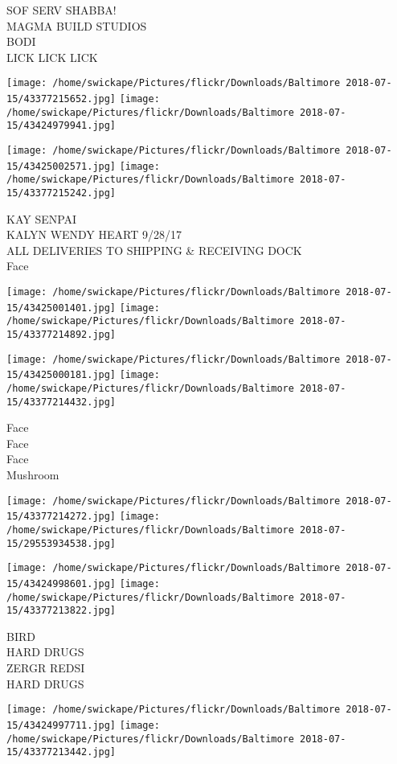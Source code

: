 \documentclass[10pt,letterpaper]{article}
\begin{document}
SOF SERV SHABBA!\\
MAGMA BUILD STUDIOS\\
BODI\\
LICK LICK LICK
\pagebreak

\texttt{[image: /home/swickape/Pictures/flickr/Downloads/Baltimore 2018-07-15/43377215652.jpg]}
\texttt{[image: /home/swickape/Pictures/flickr/Downloads/Baltimore 2018-07-15/43424979941.jpg]}

\texttt{[image: /home/swickape/Pictures/flickr/Downloads/Baltimore 2018-07-15/43425002571.jpg]}
\texttt{[image: /home/swickape/Pictures/flickr/Downloads/Baltimore 2018-07-15/43377215242.jpg]}

KAY SENPAI\\
KALYN WENDY HEART 9/28/17\\
ALL DELIVERIES TO SHIPPING \& RECEIVING DOCK\\
Face
\pagebreak

\texttt{[image: /home/swickape/Pictures/flickr/Downloads/Baltimore 2018-07-15/43425001401.jpg]}
\texttt{[image: /home/swickape/Pictures/flickr/Downloads/Baltimore 2018-07-15/43377214892.jpg]}

\texttt{[image: /home/swickape/Pictures/flickr/Downloads/Baltimore 2018-07-15/43425000181.jpg]}
\texttt{[image: /home/swickape/Pictures/flickr/Downloads/Baltimore 2018-07-15/43377214432.jpg]}

Face\\
Face\\
Face\\
Mushroom
\pagebreak

\texttt{[image: /home/swickape/Pictures/flickr/Downloads/Baltimore 2018-07-15/43377214272.jpg]}
\texttt{[image: /home/swickape/Pictures/flickr/Downloads/Baltimore 2018-07-15/29553934538.jpg]}

\texttt{[image: /home/swickape/Pictures/flickr/Downloads/Baltimore 2018-07-15/43424998601.jpg]}
\texttt{[image: /home/swickape/Pictures/flickr/Downloads/Baltimore 2018-07-15/43377213822.jpg]}

BIRD\\
HARD DRUGS\\
ZERGR REDSI\\
HARD DRUGS
\pagebreak

\texttt{[image: /home/swickape/Pictures/flickr/Downloads/Baltimore 2018-07-15/43424997711.jpg]}
\texttt{[image: /home/swickape/Pictures/flickr/Downloads/Baltimore 2018-07-15/43377213442.jpg]}
\end{document}

